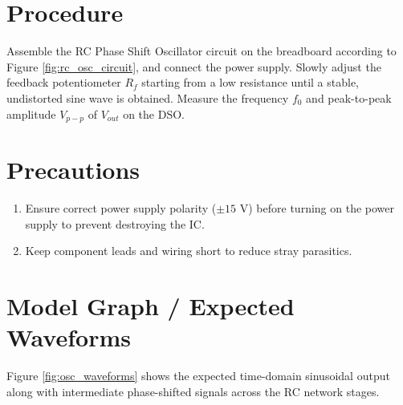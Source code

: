\section{Procedure}
Assemble the RC Phase Shift Oscillator circuit on the breadboard according to Figure \ref{fig:rc_osc_circuit}, and connect the power supply.
Slowly adjust the feedback potentiometer $R_f$ starting from a low resistance until a stable, undistorted sine wave is obtained.
Measure the frequency $f_0$ and peak-to-peak amplitude $V_{p-p}$ of $V_{out}$ on the DSO. %

\section{Precautions}
\begin{enumerate}
	\item Ensure correct power supply polarity ($\pm 15\text{ V}$) before turning on the power supply to prevent destroying the IC.
	\item Keep component leads and wiring short to reduce stray parasitics.
\end{enumerate}

\section{Model Graph / Expected Waveforms}
Figure \ref{fig:osc_waveforms} shows the expected time-domain sinusoidal output along with intermediate phase-shifted signals across the RC network stages.

